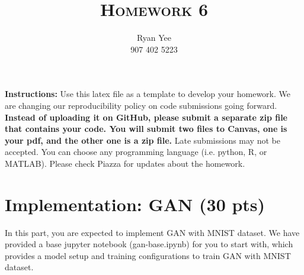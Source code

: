 \documentclass[a4paper]{article}
\title{\textsc{Homework 6}} %
\author{
	Ryan Yee \\
	907 402 5223 \\
}
\date{}
\theoremstyle{definition}
\begin{document}
	
	\maketitle 
	
        \textbf{Instructions:}
        Use this latex file as a template to develop your homework. We are changing our reproducibility policy on code submissions going forward. \textbf{Instead of uploading it on GitHub, please submit a separate zip file that contains your code. You will submit two files to Canvas, one is your pdf, and the other one is a zip file.} Late submissions may not be accepted. You can choose any programming language (i.e. python, R, or MATLAB). Please check Piazza for updates about the homework.
        \vspace{0.1in}
	
	\section{Implementation: GAN (30 pts)}
	In this part, you are expected to implement GAN with MNIST dataset. We have provided a base jupyter notebook (gan-base.ipynb) for you to start with, which provides a model setup and training configurations to train GAN with MNIST dataset.
	
\end{document}
